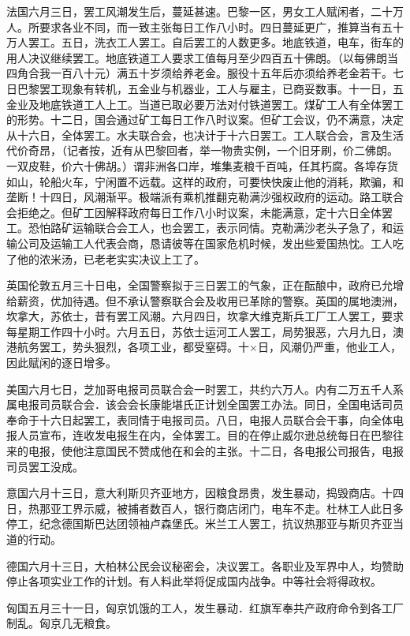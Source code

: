 法国\quad{}六月三日，罢工风潮发生后，蔓延甚速。巴黎一区，男女工人赋闲者，二十万人。所要求各业不同，而一致主张每日工作八小时。四日蔓延更广，推算当有五十万人罢工。五日，洗衣工人罢工。自后罢工的人数更多。地底铁道，电车，街车的用人决议继续罢工。地底铁道工人要求工值每月至少四百五十佛朗。（以每佛朗当四角合我一百八十元）满五十岁须给养老金。服役十五年后亦须给养老金若干。七日巴黎罢工现象有转机，五金业与机器业，工人与雇主，已商妥数事。十一日，五金业及地底铁道工人上工。当道已取必要万法对付铁道罢工。煤矿工人有全体罢工的形势。十二日，国会通过矿工每日工作八时议案。但矿工会议，仍不满意，决定从十六日，全体罢工。水夫联合会，也决计于十六日罢工。工人联合会，言及生活代价奇昂，（记者按，近有从巴黎回者，举一物贵实例，一个旧牙刷，价二佛朗。一双皮鞋，价六十佛胡。）谓非洲各口岸，堆集麦粮千百吨，任其朽腐。各埠存货如山，轮船火车，宁闲置不远载。这样的政府，可要快快废止他的消耗，欺骗，和垄断！十四日，风潮渐平。极端派有乘机推翻克勒满沙强权政府的运动。路工联合会拒绝之。但矿工因解释政府每日工作八小时议案，未能满意，定十六日全体罢工。恐怕路矿运输联合会工人，也会罢工，表示同情。克勒满沙老头子急了，和运输公司及运输工人代表会商，恳请彼等在国家危机时候，发出些爱国热忱。工人吃了他的浓米汤，已老老实实决议上工了。

英国\quad{}伦敦五月三十日电，全国警察拟于三日罢工的气象，正在酝酿中，政府已允增给薪资，优加待遇。但不承认警察联合会及收用已革除的警察。英国的属地澳洲，坎拿大，苏依士，昔有罢工风潮。六月四日，坎拿大维克斯兵工厂工人罢工，要求每星期工作四十小时。六月五日，苏依士运河工人罢工，局势狠恶，六月九日，澳港航务罢工，势头狠烈，各项工业，都受窒碍。十×日，风潮仍严重，他业工人，因此赋闲的逐日增多。

美国\quad{}六月七日，芝加哥电报司员联合会一时罢工，共约六万人。内有二万五千人系属电报司员联合会．该会会长康能堪氏正计划全国罢工办法。同日，全国电话司员奉命于十六日起罢工，表同情于电报司员。八日，电报人员联合会干事，向全体电报人员宣布，连收发电报生在内，全体罢工。目的在停止威尔逊总统每日在巴黎往来的电报，使他注意国民不赞成他在和会的主张。十二日，各电报公司报告，电报司员罢工没成。

意国\quad{}六月十三日，意大利斯贝齐亚地方，因粮食昂贵，发生暴动，捣毁商店。十四日，热那亚工界示威，被捕者数百人，银行商店闭门，电车不走。杜林工人此日多停工，纪念德国斯巴达团领袖卢森堡氏。米兰工人罢工，抗议热那亚与斯贝齐亚当道的行动。

德国\quad{}六月十三日，大柏林公民会议秘密会，决议罢工。各职业及军界中人，均赞助停止各项实业工作的计划。有人料此举将促成国内战争。中等社会将得政权。

匈国\quad{}五月三十一日，匈京饥饿的工人，发生暴动．红旗军奉共产政府命令到各工厂制乱。匈京几无粮食。

